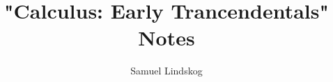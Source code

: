 \documentclass[nobib,notoc]{tufte-handout}
\begin{document}
\theoremstyle{definition}\newtheorem{defi}{Definition}[section]
\theoremstyle{definition}\newtheorem{thm}{Theorem}[section]
\theoremstyle{definition}\newtheorem{cor}{Corollary}[section]
\theoremstyle{definition}\newtheorem{lem}{Lemma}[section]
\theoremstyle{remark}\newtheorem*{notat}{Notation}
\theoremstyle{definition}\newtheorem{problem}{Problem}
\newenvironment{prob}[1]{\protect\setcounter{problem}{#1}\addtocounter{problem}{-1}\begin{problem}}{\end{problem}}

\title{"Calculus: Early Trancendentals" Notes}
\author{Samuel Lindskog}
\maketitle

\setcounter{section}{1}
\setcounter{tocdepth}{1}
\end{document}
